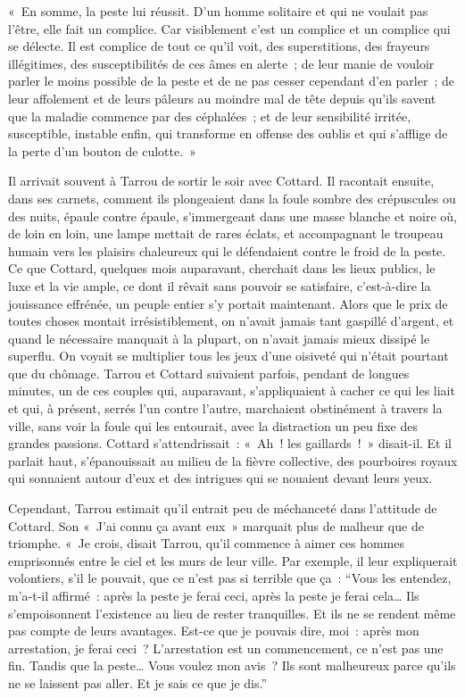 \documentclass[french,twoside]{book} %
\begin{document}
« En somme, la peste lui réussit. D’un homme solitaire et qui ne voulait pas l’être, elle fait un complice. Car visiblement c’est un complice et un complice qui se délecte. Il est complice de tout ce qu’il voit, des superstitions, des frayeurs illégitimes, des susceptibilités de ces âmes en alerte ; de leur manie de vouloir parler le moins possible de la peste et de ne pas cesser cependant d’en parler ; de leur affolement et de leurs pâleurs au moindre mal de tête depuis qu’ils savent que la maladie commence par des céphalées ; et de leur sensibilité irritée, susceptible, instable enfin, qui transforme en offense des oublis et qui s’afflige de la perte d’un bouton de culotte. »\par
Il arrivait souvent à Tarrou de sortir le soir avec Cottard. Il racontait ensuite, dans ses carnets, comment ils plongeaient dans la foule sombre des crépuscules ou des nuits, épaule contre épaule, s’immergeant dans une masse blanche et noire où, de loin en loin, une lampe mettait de rares éclats, et accompagnant le troupeau humain vers les plaisirs chaleureux qui le défendaient contre le froid de la peste. Ce que Cottard, quelques mois auparavant, cherchait dans les lieux publics, le luxe et la vie ample, ce dont il rêvait sans pouvoir se satisfaire, c’est-à-dire la jouissance effrénée, un peuple entier s’y portait maintenant. Alors que le prix de toutes choses montait irrésistiblement, on n’avait jamais tant gaspillé d’argent, et quand le nécessaire manquait à la plupart, on n’avait jamais mieux dissipé le superflu. On voyait se multiplier tous les jeux d’une oisiveté qui n’était pourtant que du chômage. Tarrou et Cottard suivaient parfois, pendant de longues minutes, un de ces couples qui, auparavant, s’appliquaient à cacher ce qui les liait et qui, à présent, serrés l’un contre l’autre, marchaient obstinément à travers la ville, sans voir la foule qui les entourait, avec la distraction un peu fixe des grandes passions. Cottard s’attendrissait : « Ah ! les gaillards ! » disait-il. Et il parlait haut, s’épanouissait au milieu de la fièvre collective, des pourboires royaux qui sonnaient autour d’eux et des intrigues qui se nouaient devant leurs yeux.\par
Cependant, Tarrou estimait qu’il entrait peu de méchanceté dans l’attitude de Cottard. Son « J’ai connu ça avant eux » marquait plus de malheur que de triomphe. « Je crois, disait Tarrou, qu’il commence à aimer ces hommes emprisonnés entre le ciel et les murs de leur ville. Par exemple, il leur expliquerait volontiers, s’il le pouvait, que ce n’est pas si terrible que ça : “Vous les entendez, m’a-t-il affirmé : après la peste je ferai ceci, après la peste je ferai cela… Ils s’empoisonnent l’existence au lieu de rester tranquilles. Et ils ne se rendent même pas compte de leurs avantages. Est-ce que je pouvais dire, moi : après mon arrestation, je ferai ceci ? L’arrestation est un commencement, ce n’est pas une fin. Tandis que la peste… Vous voulez mon avis ? Ils sont malheureux parce qu’ils ne se laissent pas aller. Et je sais ce que je dis.”\par
\end{document}
